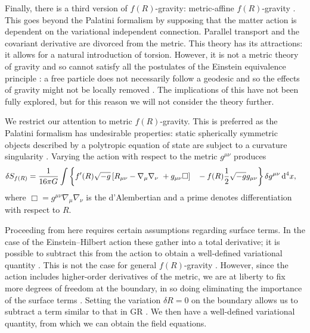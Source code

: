 Finally, there is a third version of $f(R)$-gravity: metric-affine $f(R)$-gravity \citep{Sotiriou2007, Sotiriou2007b}. This goes beyond the Palatini formalism by supposing that the matter action is dependent on the variational independent connection. Parallel transport and the covariant derivative are divorced from the metric. This theory has its attractions: it allows for a natural introduction of torsion. However, it is not a metric theory of gravity and so cannot satisfy all the postulates of the Einstein equivalence principle \citep{Will2006}: a free particle does not necessarily follow a geodesic and so the effects of gravity might not be locally removed \citep{Exirifard2008}. The implications of this have not been fully explored, but for this reason we will not consider the theory further.

We restrict our attention to metric $f(R)$-gravity. This is preferred as the Palatini formalism has undesirable properties: static spherically symmetric objects described by a polytropic equation of state are subject to a curvature singularity \citep{Barausse2008b, Barausse2008a, DeFelice2010}. Varying the action with respect to the metric $g^{\mu\nu}$ produces
\begin{align}
\delta S_{f(R)} = {} & \recip{16\pi G}\int\left\{f'(R)\sqrt{-g}\left[R_{\mu\nu} - \nabla_\mu\nabla_\nu\ + g_{\mu\nu}\Box\right] \hphantom{\frac{0}{0}} \vphantom{\frac{0}{0}} - f(R)\recip{2}\sqrt{-g}g_{\mu\nu}\right\}\delta g^{\mu\nu}\,\dd^4x,
\end{align}
where $\Box = g^{\mu\nu}\nabla_\mu\nabla_\nu$ is the d'Alembertian and a prime denotes differentiation with respect to $R$.

Proceeding from here requires certain assumptions regarding surface terms. In the case of the Einstein--Hilbert action these gather into a total derivative; it is possible to subtract this from the action to obtain a well-defined variational quantity \citep{York1972, Gibbons1977}. This is not the case for general $f(R)$-gravity \citep{Madsen1989}. However, since the action includes higher-order derivatives of the metric, we are at liberty to fix more degrees of freedom at the boundary, in so doing eliminating the importance of the surface terms \citep{Dyer2009a, Sotiriou2010}. Setting the variation $\delta R = 0$ on the boundary allows us to subtract a term similar to that in GR \citep{Guarnizo2010}. We then have a well-defined variational quantity, from which we can obtain the field equations.


